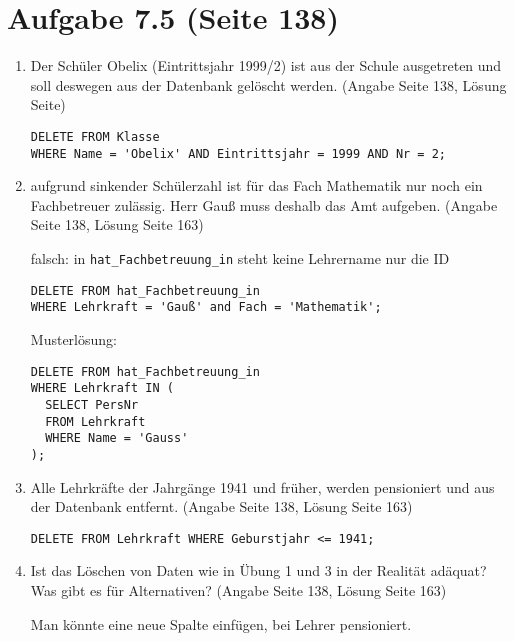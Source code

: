 \documentclass{bschlangaul-haupt}
\begin{document}
\section{Aufgabe 7.5 (Seite 138)}

\begin{enumerate}


\item Der Schüler Obelix (Eintrittsjahr 1999/2) ist aus der Schule
ausgetreten und soll deswegen aus der Datenbank gelöscht werden. (Angabe
Seite 138, Lösung Seite)

\begin{verbatim}
DELETE FROM Klasse
WHERE Name = 'Obelix' AND Eintrittsjahr = 1999 AND Nr = 2;
\end{verbatim}


\item aufgrund sinkender Schülerzahl ist für das Fach Mathematik nur
noch ein Fachbetreuer zulässig. Herr Gauß muss deshalb das Amt aufgeben.
(Angabe Seite 138, Lösung Seite 163)

falsch: in \verb|hat_Fachbetreuung_in| steht keine Lehrername nur die ID

\begin{verbatim}
DELETE FROM hat_Fachbetreuung_in
WHERE Lehrkraft = 'Gauß' and Fach = 'Mathematik';
\end{verbatim}

Musterlösung:

\begin{verbatim}
DELETE FROM hat_Fachbetreuung_in
WHERE Lehrkraft IN (
  SELECT PersNr
  FROM Lehrkraft
  WHERE Name = 'Gauss'
);
\end{verbatim}


\item Alle Lehrkräfte der Jahrgänge 1941 und früher, werden pensioniert
und aus der Datenbank entfernt. (Angabe Seite 138, Lösung Seite 163)

\begin{verbatim}
DELETE FROM Lehrkraft WHERE Geburstjahr <= 1941;
\end{verbatim}


\item Ist das Löschen von Daten wie in Übung 1 und 3 in der Realität
adäquat? Was gibt es für Alternativen? (Angabe Seite 138, Lösung Seite
163)

\begin{liAntwort}
Man könnte eine neue Spalte einfügen, \zB bei Lehrer pensioniert.
\end{liAntwort}

\end{enumerate}
\end{document}
